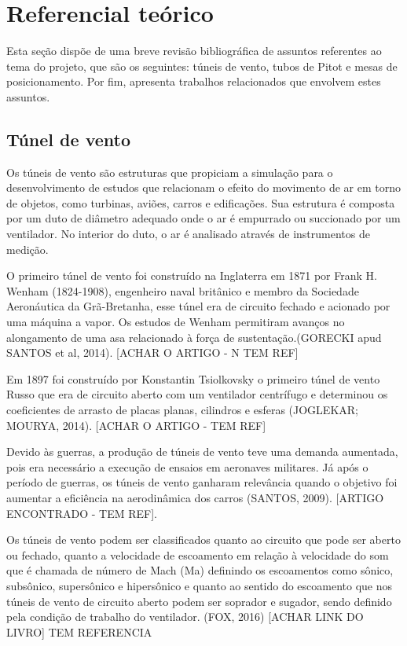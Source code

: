 \chapter{Referencial teórico}
\label{chap:referencial}

Esta seção dispõe de uma breve revisão bibliográfica de assuntos referentes ao tema do projeto, que são 
os seguintes: túneis de vento, tubos de Pitot e mesas de posicionamento. Por fim, apresenta trabalhos 
relacionados que envolvem estes assuntos.

\section{Túnel de vento}

Os túneis de vento são estruturas que propiciam a simulação para o desenvolvimento de estudos que relacionam 
o efeito do movimento de ar em torno de objetos, como turbinas, aviões, carros e edificações. Sua estrutura 
é composta por um duto de diâmetro adequado onde o ar é empurrado ou succionado por um ventilador. No 
interior do duto, o ar é analisado através de instrumentos de medição.

O primeiro túnel de vento foi construído na Inglaterra em 1871 por Frank H. Wenham (1824-1908), engenheiro 
naval britânico e membro da Sociedade Aeronáutica da Grã-Bretanha, esse túnel era de circuito fechado e 
acionado por uma máquina a vapor. Os estudos de Wenham permitiram avanços no alongamento de uma asa 
relacionado à força de sustentação.(GORECKI apud SANTOS et al, 2014). [ACHAR O ARTIGO - N TEM REF]

Em 1897 foi construído por Konstantin Tsiolkovsky o primeiro túnel de vento Russo que era de circuito 
aberto com um ventilador centrífugo e determinou os coeficientes de arrasto de placas planas, cilindros 
e esferas (JOGLEKAR; MOURYA, 2014). [ACHAR O ARTIGO - TEM REF]

Devido às guerras, a produção de túneis de vento teve uma demanda aumentada, pois era necessário a execução 
de ensaios em aeronaves militares. Já após o período de guerras, os túneis de vento ganharam relevância 
quando o objetivo foi aumentar a eficiência na aerodinâmica dos carros (SANTOS, 2009). 
[ARTIGO ENCONTRADO - TEM REF].

Os túneis de vento podem ser classificados  quanto ao circuito que pode ser aberto ou fechado,  quanto a velocidade 
de escoamento em relação à velocidade do som que é chamada de  número de Mach (Ma) definindo os escoamentos como sônico, 
subsônico, supersônico e hipersônico e quanto ao sentido do escoamento que nos túneis de vento de circuito aberto podem 
ser soprador e sugador, sendo definido pela condição de trabalho do  ventilador. (FOX, 2016) 
[ACHAR LINK DO LIVRO]  TEM REFERENCIA

